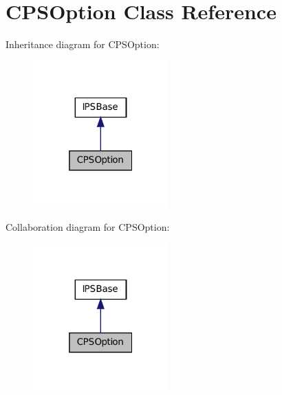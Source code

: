 \hypertarget{classCPSOption}{
\section{CPSOption Class Reference}
\label{classCPSOption}
}


Inheritance diagram for CPSOption:\nopagebreak
\begin{figure}[H]
\begin{center}
\leavevmode
\includegraphics[width=148pt]{classCPSOption__inherit__graph}
\end{center}
\end{figure}


Collaboration diagram for CPSOption:\nopagebreak
\begin{figure}[H]
\begin{center}
\leavevmode
\includegraphics[width=148pt]{classCPSOption__coll__graph}
\end{center}
\end{figure}
